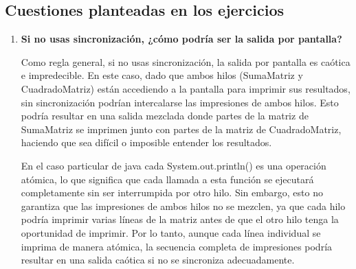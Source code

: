 \documentclass[a4paper,12pt,titlepage,oneside]{article}
\begin{document}
    \subsection{Cuestiones planteadas en los ejercicios}
        \begin{enumerate}[label=\alph*)]
        \item \textbf{Si no usas sincronización, ¿cómo podría ser la salida por pantalla?}

        Como regla general, si no usas sincronización, la salida por pantalla es caótica e impredecible. En este caso, dado que ambos 
        hilos (SumaMatriz y CuadradoMatriz) están accediendo a la pantalla para imprimir sus resultados, sin sincronización podrían 
        intercalarse las impresiones de ambos hilos. Esto podría resultar en una salida mezclada donde partes de la matriz de SumaMatriz 
        se imprimen junto con partes de la matriz de CuadradoMatriz, haciendo que sea difícil o imposible entender los resultados.

        \noindent En el caso particular de java cada System.out.println() es una operación atómica, lo que significa que cada llamada a esta 
        función se ejecutará completamente sin ser interrumpida por otro hilo. Sin embargo, esto no garantiza que las impresiones de ambos hilos 
        no se mezclen, ya que cada hilo podría imprimir varias líneas de la matriz antes de que el otro hilo tenga la oportunidad de imprimir. 
        Por lo tanto, aunque cada línea individual se imprima de manera atómica, la secuencia completa de impresiones podría resultar en una salida 
        caótica si no se sincroniza adecuadamente.
        \end{enumerate}

    \newpage
\end{document}
